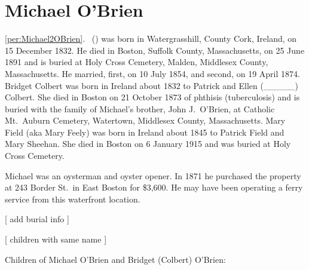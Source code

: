 \section{Michael O'Brien}

\ref{per:Michael2OBrien}.\  () was born in Watergrasshill, County Cork, Ireland, on 15 December 1832.\cite{Michael2OBrienNaturalization} He died in Boston, Suffolk County, Massachusetts, on 25 June 1891\cite{Michael2OBrienDeath} and is buried at Holy Cross Cemetery, Malden, Middlesex County, Massachusetts.\cite{DianaBerberenaLetter2} He married, first,  on 10 July 1854,\cite{BridgetColbertMarriage} and second,  on 19 April 1874.\cite{MaryFieldMarriage} Bridget Colbert was born in Ireland about 1832 to Patrick and Ellen (\_\_\_\_\_) Colbert.\cite{BridgetColbertMarriage} She died in Boston on 21 October 1873 of phthisis (tuberculosis)\cite{BridgetColbertDeath} and is buried with the family of Michael's brother, John J.\ O'Brien, at Catholic Mt.\ Auburn Cemetery, Watertown, Middlesex County, Massachusetts.\cite{BillMcEvoy} Mary Field (aka Mary Feely) was born in Ireland about 1845\cite{MaryFieldMarriage} to Patrick Field and Mary Sheehan.\cite{MaryFieldDeath} She died in Boston on 6 January 1915 and was buried at Holy Cross Cemetery.\cite{MaryFieldDeath}

Michael was an oysterman and oyster opener.\cite{EdwardFrancis3OBrienBirth,Michael2OBrien1886} In 1871 he purchased the property at 243 Border St.\ in East Boston for \$3,600.\cite{243BorderPurchase,243BorderMap} He may have been operating a ferry service from this waterfront location.\cite{243BorderFerry}

[ add burial info ]

[ children with same name ]

\begin{KidsIntro}
	Children of Michael O'Brien and Bridget (Colbert) O'Brien:
\end{KidsIntro}

